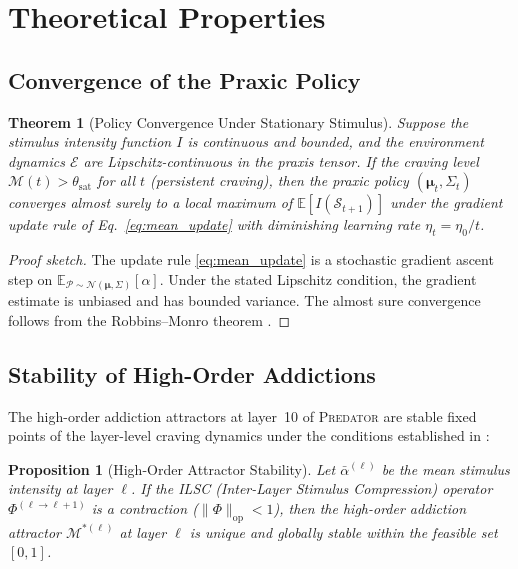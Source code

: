 \documentclass[12pt,a4paper]{article}
\newtheorem{proposition}{Proposition}[section]
\newtheorem{theorem}{Theorem}[section]
\newcommand{\PREDATOR}{\textsc{Predator}}
\begin{document}
\section{Theoretical Properties}
\label{sec:theory}

\subsection{Convergence of the Praxic Policy}

\begin{theorem}[Policy Convergence Under Stationary Stimulus]
\label{thm:convergence}
Suppose the stimulus intensity function $I$ is continuous and bounded, and
the environment dynamics $\mathcal{E}$ are Lipschitz-continuous in the
praxis tensor. If the craving level $\mathcal{M}(t) > \theta_{\text{sat}}$
for all $t$ (persistent craving), then the praxic policy $(\boldsymbol{\mu}_t,
\Sigma_t)$ converges almost surely to a local maximum of $\mathbb{E}[I(\mathcal{S}_{t+1})]$
under the gradient update rule of Eq.~\eqref{eq:mean_update} with
diminishing learning rate $\eta_t = \eta_0 / t$.
\end{theorem}

\begin{proof}[Proof sketch]
The update rule \eqref{eq:mean_update} is a stochastic gradient ascent step
on $\mathbb{E}_{\mathcal{P} \sim \mathcal{N}(\boldsymbol{\mu},\Sigma)}[\alpha]$.
Under the stated Lipschitz condition, the gradient estimate is unbiased and
has bounded variance. The almost sure convergence follows from the
Robbins--Monro theorem \cite{robbins1951stochastic}.
\end{proof}

\subsection{Stability of High-Order Addictions}

The high-order addiction attractors at layer~10 of \PREDATOR{} are stable
fixed points of the layer-level craving dynamics under the conditions established
in \cite{tapiador2024daf}:

\begin{proposition}[High-Order Attractor Stability]
\label{prop:attractor}
Let $\bar{\alpha}^{(\ell)}$ be the mean stimulus intensity at layer $\ell$.
If the ILSC (Inter-Layer Stimulus Compression) operator $\Phi^{(\ell \to \ell+1)}$
is a contraction ($\|\Phi\|_{\text{op}} < 1$), then the high-order addiction
attractor $\mathcal{M}^{*(\ell)}$ at layer $\ell$ is unique and globally stable
within the feasible set $[0,1]$.
\end{proposition}
\end{document}
